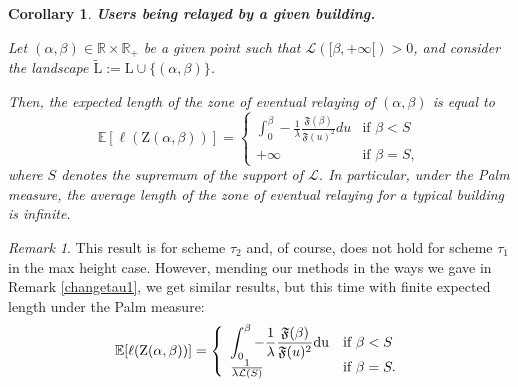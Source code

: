 \documentclass[10pt,english,a4paper]{smfart}
\newtheorem{corollary}{Corollary}[section]
\theoremstyle{definition}
\theoremstyle{remark}
\newtheorem{remark}{Remark}
\newcommand{\R}{\mathbb{R}}
\newcommand{\landsc}{\mathrm{L}}
\newcommand{\Half}{\R \times \R_+}
\newcommand{\primi}{\mathfrak{F}}
\newcommand{\zone}{\mathrm{Z}}
\newcommand{\e}{\mathbb{E}}
\begin{document}
\begin{corollary}\label{typical} \textbf{Users being relayed by a given building.}

Let $(\alpha, \beta)\in \Half$ be a given point such that $\mathcal{L}([\beta,  +\infty[)>0$, and consider the landscape $\tilde{\landsc} := \landsc\cup \{(\alpha, \beta)\}$. 

Then, the expected length of the zone of eventual relaying of $(\alpha, \beta)$ is equal to 
$$\e[\ell(\zone(\alpha, \beta))] =\left\{
    \begin{array}{ll}
        \displaystyle\int_{0}^{\beta} -\frac{1}{\lambda}\frac{\primi(\beta)}{\primi(u)^2}du & \mbox{if } \beta<S \\
        +\infty & \mbox{if }\beta=S,
    \end{array}
\right.$$
where $S$ denotes the supremum of the support of $\mathcal{L}$. 
In particular, under the Palm measure, the average length of the zone of eventual relaying for a typical building is infinite.
\end{corollary}
\begin{remark}
This result is for scheme $\tau_2$ and, of course, does not hold for scheme $\tau_1$ in the max height case. However, mending our methods in the ways we gave in Remark \ref{changetau1}, we get similar results, but this time with finite expected length under the Palm measure:
$$\e[\ell(\zone(\alpha, \beta))] =\left\{
    \begin{array}{ll}
        \displaystyle\int_{0}^{\beta} -\frac{1}{\lambda}\frac{\primi(\beta)}{\primi(u)^2}\rm{d}u & \mbox{if } \beta<S \\
       \frac{1}{\lambda \mathcal{L}(S)} & \mbox{if }\beta=S.
    \end{array}
\right.$$
\end{remark}
\end{document}
